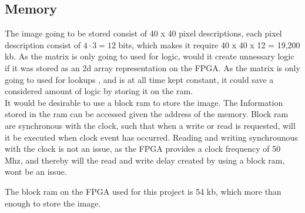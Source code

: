 \subsection{Memory}
The image going to be stored consist of 40 x 40 pixel descriptions, each pixel description consist of $4 \cdot 3 = 12$ bits,  which makes it require 40 x 40 x 12   =  19,200 kb.  As the matrix is only going to used for logic, would it create unnessary logic if it was stored as an 2d array representation on the FPGA. As the matrix is only going to used for lookups , and is at all time kept constant, it could save a considered amount of logic by storing it on the ram. 	\\
It would be desirable to use a block ram to store the image.  The Information stored in the ram can be accessed given the address of the memory. Block ram are synchronous with the clock, such that when a write or read is requested, will it be executed when clock event has occurred. Reading and writing synchrounous with the clock is not an issue, as the FPGA provides a clock frequency of 50 Mhz, and thereby will the read and write delay created by using a block ram, wont be an issue. 

The block ram on the FPGA used for this project is 54 kb, which more than enough to store the image. \cite{FPGA}

